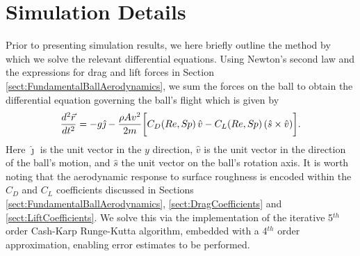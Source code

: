 \documentclass[a4paper]{article}
\begin{document}
\section{Simulation Details}
\label{sect:SimulationDetails}
Prior to presenting simulation results, we here briefly outline the method by which we solve the relevant differential equations.  Using Newton's second law and the expressions for drag and lift forces in Section \ref{sect:FundamentalBallAerodynamics}, we sum the forces on the ball to obtain the differential equation governing the ball's flight which is given by
%
\begin{equation}
\frac{d^2{\vec{r}}}{dt^2} = -g\hat{\jmath} - \frac{\rho{A}v^2}{2m}\bigg[C_{D}(Re,S\!{\kern 0.125em}p)\,\hat{v} - C_{L}(Re,S\!{\kern 0.125em}p)\,(\hat{s}\times\hat{v})\bigg].
\end{equation}  
%
Here $\hat\jmath$ is the unit vector in the $y$ direction, $\hat{v}$ is the unit vector in the direction of the ball's motion, and $\hat{s}$ the unit vector on the ball's rotation axis.  It is worth noting that the aerodynamic response to surface roughness is encoded within the $C_D$ and $C_L$ coefficients discussed in Sections \ref{sect:FundamentalBallAerodynamics}, \ref{sect:DragCoefficients} and \ref{sect:LiftCoefficients}.  We solve this via the implementation of the iterative 5$^{th}$ order Cash-Karp Runge-Kutta algorithm, embedded with a 4$^{th}$ order approximation, enabling error estimates to be performed.
\end{document}
